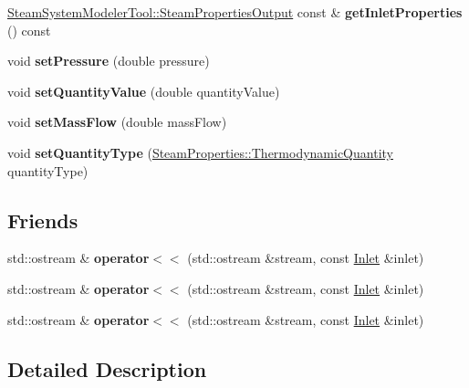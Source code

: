 \begin{DoxyCompactItemize}
\hyperlink{struct_steam_system_modeler_tool_1_1_steam_properties_output}{Steam\+System\+Modeler\+Tool\+::\+Steam\+Properties\+Output} const  \& {\bfseries get\+Inlet\+Properties} () const
\item 
\mbox{\label{class_inlet_ad0d848976347160293c6576e005f090b}} 
void {\bfseries set\+Pressure} (double pressure)
\item 
\mbox{\label{class_inlet_a64a5567c35c89f82f5782bf7b83b90c3}} 
void {\bfseries set\+Quantity\+Value} (double quantity\+Value)
\item 
\mbox{\label{class_inlet_a1e427ac34eeebf46546ed53499359459}} 
void {\bfseries set\+Mass\+Flow} (double mass\+Flow)
\item 
\mbox{\label{class_inlet_a4171632101de3f4c97c93bb06c6b51e4}} 
void {\bfseries set\+Quantity\+Type} (\hyperlink{class_steam_properties_ae0294bedf7d178c2d8fb6aed0f62fbff}{Steam\+Properties\+::\+Thermodynamic\+Quantity} quantity\+Type)
\end{DoxyCompactItemize}
\subsection*{Friends}
\begin{DoxyCompactItemize}
\item 
\mbox{\label{class_inlet_afbc89a3dfa7a320b516f8a8c4efdfecc}} 
std\+::ostream \& {\bfseries operator$<$$<$} (std\+::ostream \&stream, const \hyperlink{class_inlet}{Inlet} \&inlet)
\item 
\mbox{\label{class_inlet_afbc89a3dfa7a320b516f8a8c4efdfecc}} 
std\+::ostream \& {\bfseries operator$<$$<$} (std\+::ostream \&stream, const \hyperlink{class_inlet}{Inlet} \&inlet)
\item 
\mbox{\label{class_inlet_afbc89a3dfa7a320b516f8a8c4efdfecc}} 
std\+::ostream \& {\bfseries operator$<$$<$} (std\+::ostream \&stream, const \hyperlink{class_inlet}{Inlet} \&inlet)
\end{DoxyCompactItemize}


\subsection{Detailed Description}


